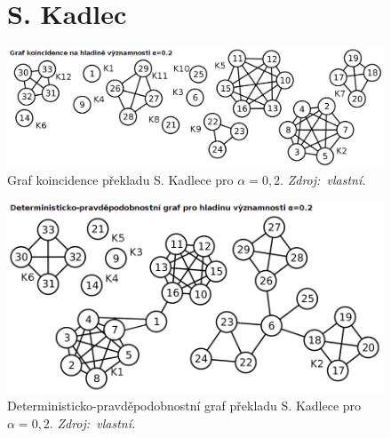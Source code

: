 \documentclass[dp.tex]{subfiles}
\begin{document}
\begin{figure}[h]
\section*{S. Kadlec}
	\centering
	\includegraphics[max width=\textwidth,keepaspectratio=true]{imgs-99-priloha-d/o_k_20}
	\caption[Graf koincidence překladu S. Kadlece pro $\alpha = 0{,}2$]
            {Graf koincidence překladu S. Kadlece pro $\alpha = 0{,}2$. \textit{Zdroj:~vlastní.}}
	\label{fig:o_k_20}
\end{figure}
\begin{figure}[p]
	\includegraphics[max width=\textwidth,keepaspectratio=true]{imgs-99-priloha-d/o_d_20}
	\caption[Deterministicko-pravděpodobnostní graf překladu S. Kadlece pro $\alpha = 0{,}2$]
	{Deterministicko-pravděpodobnostní graf překladu S. Kadlece pro $\alpha = 0{,}2$. \textit{Zdroj:~vlastní.}}
	\label{fig:o_d_20}
\end{figure}


\end{document}
